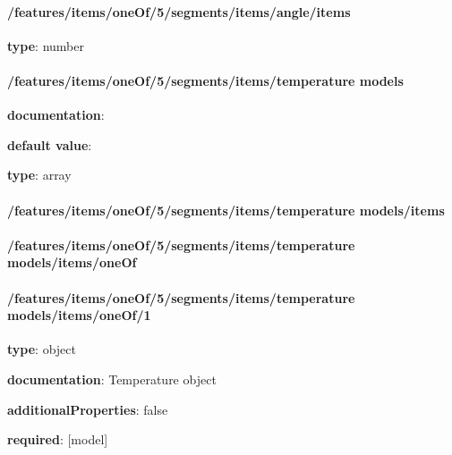 \begin{itemized}
\paragraph{/features/items/oneOf/5/segments/items/angle/items} \begin{itemized}
\item {\bf type}: number
\end{itemized}\end{itemized}\paragraph{/features/items/oneOf/5/segments/items/temperature models} \begin{itemized}
\item {\bf documentation}: 
\item {\bf default value}: 
\item {\bf type}: array
\paragraph{/features/items/oneOf/5/segments/items/temperature models/items} \begin{itemized}
\end{itemized}\end{itemized}\paragraph{/features/items/oneOf/5/segments/items/temperature models/items/oneOf} \begin{itemized}
\end{itemized}\paragraph{/features/items/oneOf/5/segments/items/temperature models/items/oneOf/1} \begin{itemized}
\item {\bf type}: object
\item {\bf documentation}: Temperature object
\item {\bf additionalProperties}: false
\item {\bf required}: [model]\end{itemized}
